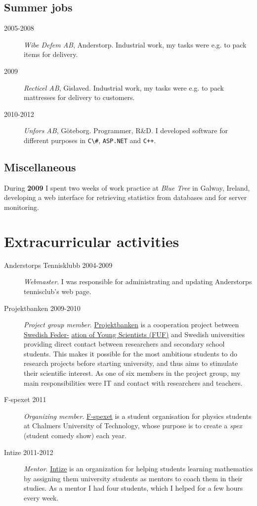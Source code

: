 \subsection*{Summer jobs}
\begin{description}
\item[2005-2008] \emph{Wibe Defem AB}, Anderstorp. Industrial work, my tasks were e.g. to pack items for delivery.
\item[2009] \emph{Recticel AB}, Gislaved. Industrial work, my tasks were e.g. to pack mattresses for delivery to customers. 
\item[2010-2012] \emph{Unfors AB}, Göteborg. Programmer, R\&D. I developed software for different purposes in \verb+C\#+, \verb+ASP.NET+ and \verb.C++.. 
\end{description}


\subsection*{Miscellaneous}
During {\bf 2009} I spent two weeks of work practice at \emph{Blue Tree} in Galway, Ireland, developing a web interface for retrieving statistics from databases and for server monitoring. 

\section*{Extracurricular activities}
\begin{description}
\item[Anderstorps Tennisklubb 2004-2009] \emph{Webmaster}. I was responsible for administrating and updating Anderstorps tennisclub's web page.
\item[Projektbanken 2009-2010] \emph{Project group member}. \href{http://www.fuf.org/projektbanken/}{Projektbanken} is a cooperation project between \href{http://www.fuf.org/}{Swedish Feder-} \href{http://www.fuf.org/}{ation of Young Scientists (FUF)} and Swedish universities providing direct contact between researchers and secondary school students. This makes it possible for the most ambitious students to do research projects before starting university, and thus aims to stimulate their scientific interest. As one of six members in the project group, my main responsibilities were IT and contact with researchers and teachers.
\item[F-spexet 2011] \emph{Organizing member}. \href{http:///www.f-spexet.se}{F-spexet} is a student organisation for physics students at Chalmers University of Technology, whose purpose is to create a \emph{spex} (student comedy show) each year.
\item[Intize 2011-2012] \emph{Mentor}. \href{http://www.intize.org}{Intize} is an organization for helping students learning mathematics by assigning them university students as mentors to coach them in their studies. As a mentor I had four students, which I helped for a few hours every week. 
\end{description}

